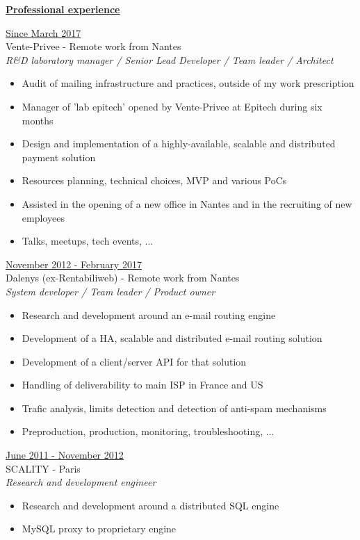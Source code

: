 \documentclass[a4paper,10pt]{letter}
\begin{document}
\underline{\textbf{Professional experience}}\\
\begin{description}
\item{\underline{Since March 2017}}\\
  Vente-Privee - Remote work from Nantes\\
  \textit{R\&D laboratory manager / Senior Lead Developer / Team leader / Architect}
  \begin{itemize}
    \item Audit of mailing infrastructure and practices, outside of my work prescription
    \item Manager of 'lab epitech' opened by Vente-Privee at Epitech during six months
    \item Design and implementation of a highly-available, scalable and distributed payment solution
    \item Resources planning, technical choices, MVP and various PoCs
    \item Assisted in the opening of a new office in Nantes and in the recruiting of new employees
    \item Talks, meetups, tech events, ...\\
  \end{itemize}

\item{\underline{November 2012 - February 2017}}\\
  Dalenys (ex-Rentabiliweb) - Remote work from Nantes\\
  \textit{System developer / Team leader / Product owner}
  \begin{itemize}
  \item Research and development around an e-mail routing engine
  \item Development of a HA, scalable and distributed e-mail routing solution
  \item Development of a client/server API for that solution
  \item Handling of deliverability to main ISP in France and US
  \item Trafic analysis, limits detection and detection of anti-spam mechanisms
  \item Preproduction, production, monitoring, troubleshooting, ...\\
  \end{itemize}

\item{\underline{June 2011 - November 2012}}\\
  SCALITY - Paris\\
  \textit{Research and development engineer}
  \begin{itemize}
  \item Research and development around a distributed SQL engine
  \item MySQL proxy to proprietary engine\\
  \end{itemize}


\end{description}
\end{document}
